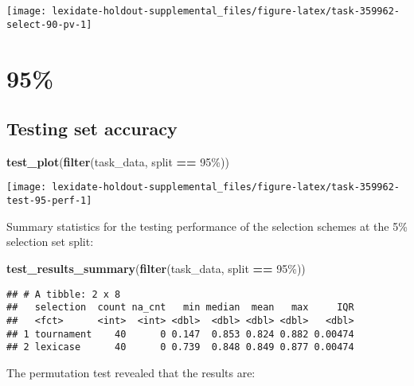\documentclass[
]{book}
\newenvironment{Shaded}{\begin{snugshade}}{\end{snugshade}}
\newcommand{\FunctionTok}[1]{\textcolor[rgb]{0.13,0.29,0.53}{\textbf{#1}}}
\newcommand{\NormalTok}[1]{#1}
\newcommand{\SpecialCharTok}[1]{\textcolor[rgb]{0.81,0.36,0.00}{\textbf{#1}}}
\newcommand{\StringTok}[1]{\textcolor[rgb]{0.31,0.60,0.02}{#1}}
\begin{document}
\texttt{[image: lexidate-holdout-supplemental\_files/figure-latex/task-359962-select-90-pv-1]}

\hypertarget{section-59}{%
\section{95\%}\label{section-59}}

\hypertarget{testing-set-accuracy-59}{%
\subsection{Testing set accuracy}\label{testing-set-accuracy-59}}

\begin{Shaded}
\begin{Highlighting}[]
\FunctionTok{test\_plot}\NormalTok{(}\FunctionTok{filter}\NormalTok{(task\_data, split }\SpecialCharTok{==} \StringTok{\textquotesingle{}95\%\textquotesingle{}}\NormalTok{))}
\end{Highlighting}
\end{Shaded}

\texttt{[image: lexidate-holdout-supplemental\_files/figure-latex/task-359962-test-95-perf-1]}

Summary statistics for the testing performance of the selection schemes at the 5\% selection set split:

\begin{Shaded}
\begin{Highlighting}[]
\FunctionTok{test\_results\_summary}\NormalTok{(}\FunctionTok{filter}\NormalTok{(task\_data, split }\SpecialCharTok{==} \StringTok{\textquotesingle{}95\%\textquotesingle{}}\NormalTok{))}
\end{Highlighting}
\end{Shaded}

\begin{verbatim}
## # A tibble: 2 x 8
##   selection  count na_cnt   min median  mean   max     IQR
##   <fct>      <int>  <int> <dbl>  <dbl> <dbl> <dbl>   <dbl>
## 1 tournament    40      0 0.147  0.853 0.824 0.882 0.00474
## 2 lexicase      40      0 0.739  0.848 0.849 0.877 0.00474
\end{verbatim}

The permutation test revealed that the results are:
\end{document}
